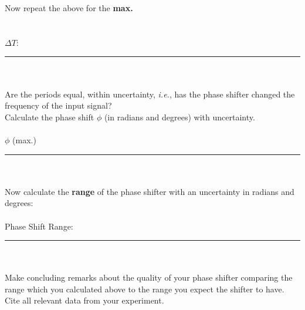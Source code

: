 \noindent Now repeat the above for the {\bf max.} 
\ \\
\ \\
\ \\
$\Delta T$: \rule{3cm}{.1mm} \\ 
\ \\
\noindent Are the periods
equal, within uncertainty, {\it i.e.}, has the phase shifter changed the
frequency of the input signal? \\
\vfill
\pagebreak
\noindent Calculate the phase shift $\phi$ (in radians and degrees) with 
uncertainty.\\
\vspace*{3cm}\\
$\phi$ (max.) \rule{3cm}{.1mm} \\ 
\ \\
\noindent Now calculate the {\bf range} of the phase shifter with an uncertainty in radians and degrees: \\
\vspace*{1.5cm}\\
Phase Shift Range: \rule{3cm}{.1mm} \\
\ \\
\noindent Make concluding remarks about the quality of your phase shifter comparing the range which you calculated above to the range you expect the shifter to have. Cite all relevant data from your experiment.

\vfill
{}



\renewcommand{\thesection}{\thechapter.\arabic{section}}

















